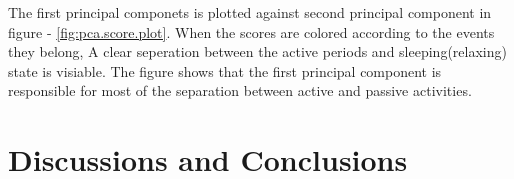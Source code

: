 \documentclass[a4paper, 11pt]{report}\usepackage[]{graphicx}\usepackage[]{color}
\makeatletter
\def\maxwidth{ %
  \ifdim\Gin@nat@width>\linewidth
    \linewidth
  \else
    \Gin@nat@width
  \fi
}
\numberwithin{figure}{section}
\makeatother
\begin{document}

The first principal componets is plotted against second principal component in figure - \ref{fig:pca.score.plot}. When the scores are colored according to the events they belong, A clear seperation between the active periods and sleeping(relaxing) state is visiable. The figure shows that the first principal component is responsible for most of the separation between active and passive activities.


\chapter{Discussions and Conclusions}


\nocite{R-data.table,R-ggplot2,R-knitr,R-pls,R-plyr,R-readr,R-reshape2}
\printbibliography
\end{document}
